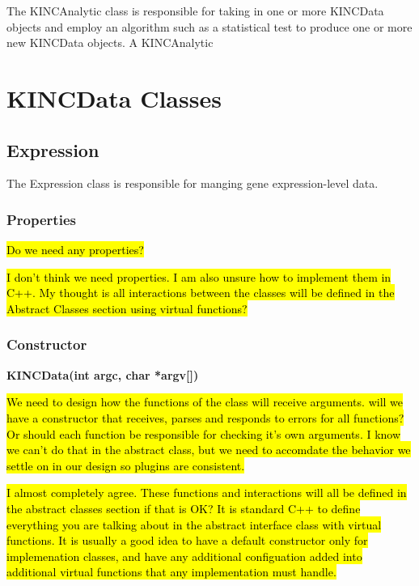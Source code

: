 \documentclass[10pt]{article}
\providecommand{\stephen}[1]{\sethlcolor{lyellow}\hl{#1}}
\providecommand{\josh}[1]{\sethlcolor{lblue}\hl{#1}}
\begin{document}
The KINCAnalytic class is responsible for taking in one or more KINCData objects
and employ an algorithm such as a statistical test to produce one or more 
new KINCData objects.   A KINCAnalytic 

\newpage
\section{KINCData Classes}

\subsection{Expression}

The Expression class is responsible for manging gene expression-level data.  

\subsubsection{Properties}

\stephen{Do we need any properties?}

\josh{I don't think we need properties. I am also unsure how to implement them 
in C++. My thought is all interactions between the classes will be defined in 
the Abstract Classes section using virtual functions?}

\subsubsection{Constructor}

{\bfseries KINCData(int argc, char *argv[])}

\stephen{We need to design how the functions of the class will receive 
arguments.  will we have a constructor that receives, parses and responds to 
errors for all functions?  Or should each function be responsible for checking 
it's own arguments. I know we can't do that in the abstract class, but 
we need to accomdate the behavior we settle on in our design so plugins
are consistent.}

\josh{I almost completely agree. These functions and interactions will all be 
defined in the abstract classes section if that is OK? It is standard C++ to 
define everything you are talking about in the abstract interface class with 
virtual functions. It is usually a good idea to have a default constructor only 
for implemenation classes, and have any additional configuation added into 
additional virtual functions that any implementation must handle.}
\end{document}
